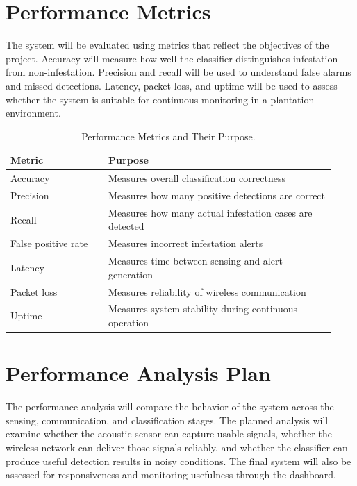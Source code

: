 \documentclass[12pt,a4paper,oneside]{memoir}
\begin{document}
\section{Performance Metrics}
\label{sec:PerformanceMetrics}

The system will be evaluated using metrics that reflect the objectives of the project. Accuracy will measure how well the classifier distinguishes infestation from non-infestation. Precision and recall will be used to understand false alarms and missed detections. Latency, packet loss, and uptime will be used to assess whether the system is suitable for continuous monitoring in a plantation environment.

\begin{table}[h]
\centering
\caption{Performance Metrics and Their Purpose.}
\label{tab:metrics}
\renewcommand{\arraystretch}{1.3}
\begin{tabular}{@{} p{0.28\linewidth} p{0.65\linewidth} @{}}
\toprule
\textbf{Metric} & \textbf{Purpose} \\
\midrule
Accuracy           & Measures overall classification correctness \\
Precision          & Measures how many positive detections are correct \\
Recall             & Measures how many actual infestation cases are detected \\
False positive rate & Measures incorrect infestation alerts \\
Latency            & Measures time between sensing and alert generation \\
Packet loss        & Measures reliability of wireless communication \\
Uptime             & Measures system stability during continuous operation \\
\bottomrule
\end{tabular}
\end{table}

\section{Performance Analysis Plan}
\label{sec:PerformanceAnalysisPlan}

The performance analysis will compare the behavior of the system across the sensing, communication, and classification stages. The planned analysis will examine whether the acoustic sensor can capture usable signals, whether the wireless network can deliver those signals reliably, and whether the classifier can produce useful detection results in noisy conditions. The final system will also be assessed for responsiveness and monitoring usefulness through the dashboard.
\end{document}

